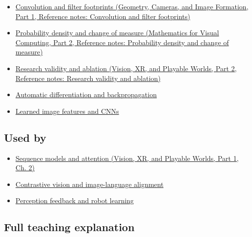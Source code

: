 \hypertarget{appendix-a9d5dfdd164a-prerequisites}{}

\begin{itemize}
\tightlist
\item
  \href{../03-Geometry-Cameras-and-Image-Formation-P01/main.pdf\#appendix-d5b3c692d9f0}{Convolution and filter footprints (Geometry, Cameras, and Image Formation, Part 1, Reference notes: Convolution and filter footprints)}
\item
  \href{../02-Mathematics-for-Visual-Computing-P02/main.pdf\#appendix-4815cd87ab8b}{Probability density and change of measure (Mathematics for Visual Computing, Part 2, Reference notes: Probability density and change of measure)}
\item
  \href{../07-Vision-XR-and-Playable-Worlds-P02/main.pdf\#appendix-65788587ef78}{Research validity and ablation (Vision, XR, and Playable Worlds, Part 2, Reference notes: Research validity and ablation)}
\item
  \hyperref[appendix-40df0855b4a7]{Automatic differentiation and backpropagation}
\item
  \hyperref[appendix-47c51ea026fb]{Learned image features and CNNs}
\end{itemize}

\subsection{Used by}\label{appendix-a9d5dfdd164a-used-by}

\hypertarget{appendix-a9d5dfdd164a-used-by}{}

\begin{itemize}
\tightlist
\item
  \href{../07-Vision-XR-and-Playable-Worlds-P01/main.pdf\#04-visual-computing-ii-ch031-sequence-models-and-attention}{Sequence models and attention (Vision, XR, and Playable Worlds, Part 1, Ch. 2)}
\item
  \hyperref[appendix-772f1fd96148]{Contrastive vision and image-language alignment}
\item
  \hyperref[appendix-b0c42da325f1]{Perception feedback and robot learning}
\end{itemize}

\subsection{Full teaching explanation}\label{appendix-a9d5dfdd164a-full-teaching-explanation}

\hypertarget{appendix-a9d5dfdd164a-full-teaching-explanation}{}

